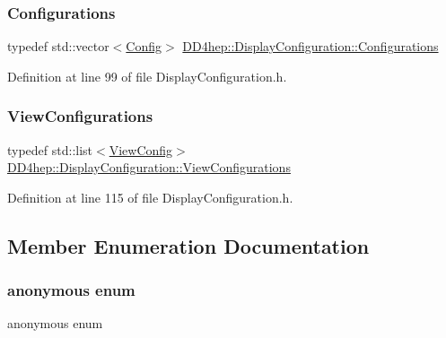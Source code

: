 \subsubsection{\texorpdfstring{Configurations}{Configurations}}
{\footnotesize\ttfamily typedef std\+::vector$<$\hyperlink{class_d_d4hep_1_1_display_configuration_1_1_config}{Config}$>$ \hyperlink{class_d_d4hep_1_1_display_configuration_ac43586ae2c70f106cc9027d452d383d7}{D\+D4hep\+::\+Display\+Configuration\+::\+Configurations}}



Definition at line 99 of file Display\+Configuration.\+h.

\hypertarget{class_d_d4hep_1_1_display_configuration_a38d6c82b57ac859a5d5cf67fe26f4920}{}\label{class_d_d4hep_1_1_display_configuration_a38d6c82b57ac859a5d5cf67fe26f4920} 
\subsubsection{\texorpdfstring{View\+Configurations}{ViewConfigurations}}
{\footnotesize\ttfamily typedef std\+::list$<$\hyperlink{class_d_d4hep_1_1_display_configuration_1_1_view_config}{View\+Config}$>$ \hyperlink{class_d_d4hep_1_1_display_configuration_a38d6c82b57ac859a5d5cf67fe26f4920}{D\+D4hep\+::\+Display\+Configuration\+::\+View\+Configurations}}



Definition at line 115 of file Display\+Configuration.\+h.



\subsection{Member Enumeration Documentation}
\hypertarget{class_d_d4hep_1_1_display_configuration_a737e6239be43c43453ad6e198ea3e643}{}\label{class_d_d4hep_1_1_display_configuration_a737e6239be43c43453ad6e198ea3e643} 
\subsubsection{\texorpdfstring{anonymous enum}{anonymous enum}}
{\footnotesize\ttfamily anonymous enum}

